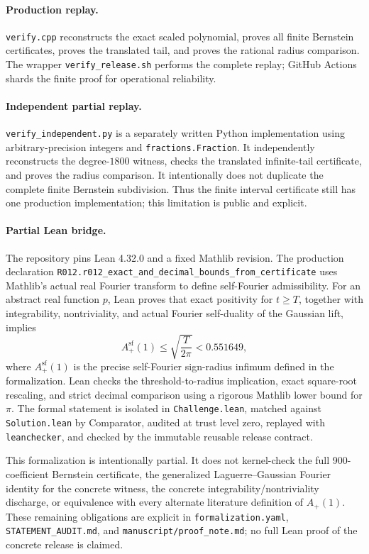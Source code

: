 \documentclass[11pt]{article}
\begin{document}
\paragraph{Production replay.}
\texttt{verify.cpp} reconstructs the exact scaled polynomial, proves all finite Bernstein certificates, proves the translated tail, and proves the rational radius comparison.
The wrapper \texttt{verify\_release.sh} performs the complete replay; GitHub Actions shards the finite proof for operational reliability.

\paragraph{Independent partial replay.}
\texttt{verify\_independent.py} is a separately written Python implementation using arbitrary-precision integers and \texttt{fractions.Fraction}.
It independently reconstructs the degree-$1800$ witness, checks the translated infinite-tail certificate, and proves the radius comparison.
It intentionally does not duplicate the complete finite Bernstein subdivision.
Thus the finite interval certificate still has one production implementation; this limitation is public and explicit.

\paragraph{Partial Lean bridge.}
The repository pins Lean 4.32.0 and a fixed Mathlib revision.
The production declaration \texttt{R012.r012\_exact\_and\_decimal\_bounds\_from\_certificate} uses Mathlib's actual real Fourier transform to define self-Fourier admissibility.
For an abstract real function $p$, Lean proves that exact positivity for $t\geq T$, together with integrability, nontriviality, and actual Fourier self-duality of the Gaussian lift, implies
\[
A^{\mathrm{sf}}_+(1)\leq\sqrt{\frac{T}{2\pi}}<0.551649,
\]
where $A^{\mathrm{sf}}_+(1)$ is the precise self-Fourier sign-radius infimum defined in the formalization.
Lean checks the threshold-to-radius implication, exact square-root rescaling, and strict decimal comparison using a rigorous Mathlib lower bound for $\pi$.
The formal statement is isolated in \texttt{Challenge.lean}, matched against \texttt{Solution.lean} by Comparator, audited at trust level zero, replayed with \texttt{leanchecker}, and checked by the immutable reusable release contract.

This formalization is intentionally partial.
It does not kernel-check the full 900-coefficient Bernstein certificate, the generalized Laguerre--Gaussian Fourier identity for the concrete witness, the concrete integrability/nontriviality discharge, or equivalence with every alternate literature definition of $A_+(1)$.
These remaining obligations are explicit in \texttt{formalization.yaml}, \texttt{STATEMENT\_AUDIT.md}, and \texttt{manuscript/proof\_note.md}; no full Lean proof of the concrete release is claimed.
\end{document}
